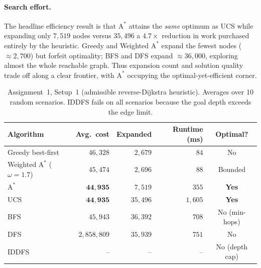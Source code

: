 \documentclass{ai-lab-report}
\begin{document}
\paragraph{Search effort.}
The headline efficiency result is that $\text{A}^\ast$ attains the \emph{same} optimum as UCS while expanding only $7{,}519$ nodes versus $35{,}496$ a $4.7\times$ reduction in work purchased entirely by the heuristic. Greedy and Weighted $\text{A}^\ast$ expand the fewest nodes ($\approx2{,}700$) but forfeit optimality; BFS and DFS expand $\approx36{,}000$, exploring almost the whole reachable graph. Thus expansion count and solution quality trade off along a clear frontier, with $\text{A}^\ast$ occupying the optimal-yet-efficient corner.

\begin{table}[H]
\centering
\small
\begin{tabularx}{\linewidth}{@{}Xrrrc@{}}
\toprule
Algorithm & Avg.\ cost & Expanded & Runtime (ms) & Optimal? \\
\midrule
Greedy best-first                         & $46{,}328$          & $2{,}679$  & $84$    & No \\
Weighted $\text{A}^\ast$ ($\omega{=}1.7$) & $45{,}474$          & $2{,}696$  & $88$    & Bounded \\
$\text{A}^\ast$                            & $\mathbf{44{,}935}$ & $7{,}519$  & $355$   & \textbf{Yes} \\
UCS                                       & $\mathbf{44{,}935}$ & $35{,}496$ & $1{,}605$ & \textbf{Yes} \\
BFS                                       & $45{,}943$          & $36{,}392$ & $708$   & No (min-hops) \\
DFS                                       & $2{,}858{,}809$     & $35{,}939$ & $751$   & No \\
IDDFS                                     & --                  & --         & --      & No (depth cap) \\
\bottomrule
\end{tabularx}
\caption{Assignment~1, Setup~1 (admissible reverse-Dijkstra heuristic). Averages over 10 random scenarios. 
IDDFS fails on all scenarios because the goal depth exceeds the edge limit.}
\label{tab:a1setup1}
\end{table}
\end{document}
